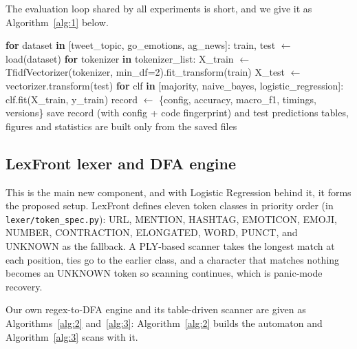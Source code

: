 \documentclass[journal,a4paper]{IEEEtran}
\begin{document}
The evaluation loop shared by all experiments is short, and we give it as Algorithm~\ref{alg:1} below.

\begin{algorithm}[!tb]
\scriptsize
\caption{Evaluation loop shared by all experiments}\label{alg:1}
\begin{algorithmic}[1]
\State \textbf{for} dataset \textbf{in} [tweet\_topic, go\_emotions, ag\_news]:
\State \hspace*{1.0em}train, test $\leftarrow$ load(dataset)
\State \hspace*{1.0em}\textbf{for} tokenizer \textbf{in} tokenizer\_list:
\State \hspace*{2.0em}X\_train $\leftarrow$ TfidfVectorizer(tokenizer, min\_df=2).fit\_transform(train)
\State \hspace*{2.0em}X\_test  $\leftarrow$ vectorizer.transform(test)
\State \hspace*{2.0em}\textbf{for} clf \textbf{in} [majority, naive\_bayes, logistic\_regression]:
\State \hspace*{3.0em}clf.fit(X\_train, y\_train)
\State \hspace*{3.0em}record $\leftarrow$ \{config, accuracy, macro\_f1, timings, versions\}
\State \hspace*{3.0em}save record (with config + code fingerprint) and test predictions
\State tables, figures and statistics are built only from the saved files
\end{algorithmic}
\end{algorithm}

\subsection{LexFront lexer and DFA engine}\label{sec:3.4}
This is the main new component, and with Logistic Regression behind it, it forms the proposed setup. LexFront defines eleven token classes in priority order (in \texttt{lexer/\allowbreak{}token\_\allowbreak{}spec.py}): URL, MENTION, HASHTAG, EMOTICON, EMOJI, NUMBER, CONTRACTION, ELONGATED, WORD, PUNCT, and UNKNOWN as the fallback. A PLY-based scanner takes the longest match at each position, ties go to the earlier class, and a character that matches nothing becomes an UNKNOWN token so scanning continues, which is panic-mode recovery.

Our own regex-to-DFA engine and its table-driven scanner are given as Algorithms~\ref{alg:2} and~\ref{alg:3}: Algorithm~\ref{alg:2} builds the automaton and Algorithm~\ref{alg:3} scans with it.
\end{document}
